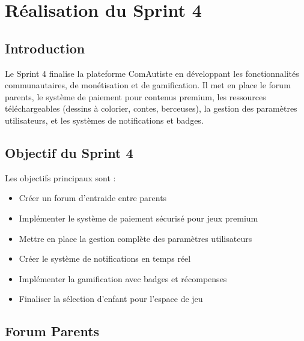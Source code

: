 \documentclass[12pt,a4paper]{report}
\begin{document}
\newpage
\chapter{Réalisation du Sprint 4}

\section*{Introduction}
Le Sprint 4 finalise la plateforme ComAutiste en développant les fonctionnalités communautaires, de monétisation et de gamification. Il met en place le forum parents, le système de paiement pour contenus premium, les ressources téléchargeables (dessins à colorier, contes, berceuses), la gestion des paramètres utilisateurs, et les systèmes de notifications et badges.

\section*{Objectif du Sprint 4}
Les objectifs principaux sont :
\begin{itemize}
\item Créer un forum d'entraide entre parents
\item Implémenter le système de paiement sécurisé pour jeux premium
\item Mettre en place la gestion complète des paramètres utilisateurs
\item Créer le système de notifications en temps réel
\item Implémenter la gamification avec badges et récompenses
\item Finaliser la sélection d'enfant pour l'espace de jeu
\end{itemize}

\section*{Forum Parents}
\end{document}
